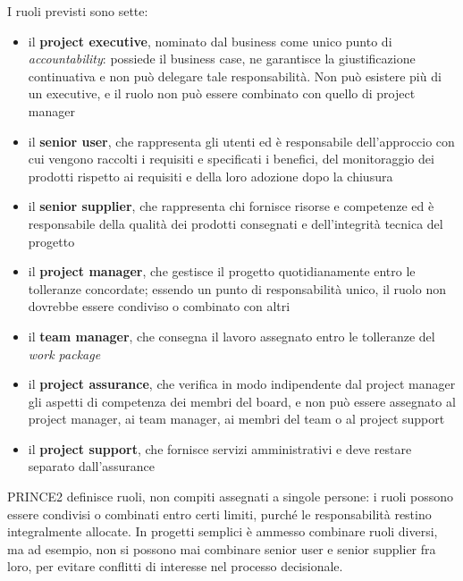 I ruoli previsti sono sette:
\begin {itemize}
\item il \textbf{project executive}, nominato dal business come unico punto di
\emph{accountability}: possiede il business case, ne garantisce la
giustificazione continuativa e non pu\`o delegare tale responsabilit\`a. Non
pu\`o esistere pi\`u di un executive, e il ruolo non pu\`o essere combinato con
quello di project manager
\item il \textbf{senior user}, che rappresenta gli utenti ed \`e
responsabile dell'approccio con cui vengono raccolti i requisiti e specificati i
benefici, del monitoraggio dei prodotti rispetto ai requisiti e della loro
adozione dopo la chiusura
\item il \textbf{senior supplier}, che rappresenta chi fornisce risorse e
competenze ed \`e responsabile della qualit\`a dei prodotti consegnati e
dell'integrit\`a tecnica del progetto
\item il \textbf{project manager}, che gestisce il progetto quotidianamente
entro le tolleranze concordate; essendo un punto di responsabilit\`a unico, il
ruolo non dovrebbe essere condiviso o combinato con altri
\item il \textbf{team manager}, che consegna il lavoro assegnato entro le
tolleranze del \emph{work package}
\item il \textbf{project assurance}, che verifica in modo indipendente dal
project manager gli aspetti di competenza dei membri del board, e non pu\`o
essere assegnato al project manager, ai team manager, ai membri del team o al
project support
\item il \textbf{project support}, che fornisce servizi amministrativi e deve
restare separato dall'assurance
\end {itemize}

PRINCE2 definisce ruoli, non compiti assegnati a singole persone: i ruoli
possono essere condivisi o combinati entro certi limiti, purch\'e le
responsabilit\`a restino integralmente allocate. In progetti semplici \`e
ammesso combinare ruoli diversi, ma ad esempio, non si possono mai combinare
senior user e senior supplier fra loro, per evitare conflitti di interesse
nel processo decisionale.

